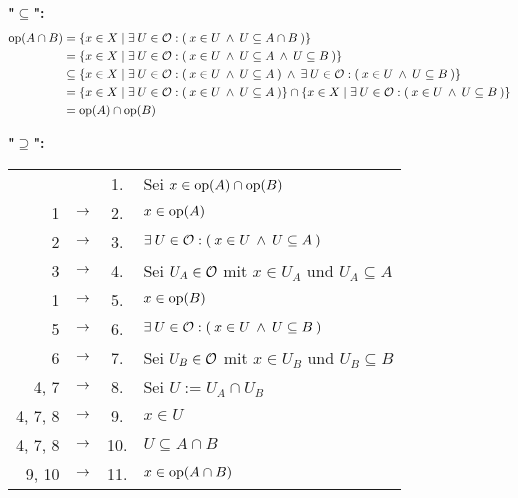     \noindent
    \textbf{"$\boldsymbol{\subseteq}$":}
        \begin{align*}
            \text{op}(A \cap B) 
            &= \{x \in X \mid \exists\: U \in \mathcal{O}: (\: x \in U \:\land\: U \subseteq A \cap B \:)\}\\
            &= \{x \in X \mid \exists\: U \in \mathcal{O}: (\: x \in U \:\land\: U \subseteq A \:\land\: U \subseteq B \:)\}\\
            &\subseteq \{x \in X \mid \exists\: U \in \mathcal{O}: (\: x \in U \:\land\: U \subseteq A\:) \:\land\: \exists\: U \in \mathcal{O}: (\: x \in U \:\land\: U \subseteq B \:)\}\\
            &= \{x \in X \mid \exists\: U \in \mathcal{O}: (\: x \in U \:\land\: U \subseteq A\:)\} \cap \{ x \in X \mid \exists\: U \in \mathcal{O}: (\: x \in U \:\land\: U \subseteq B \:)\}\\
            &= \text{op}(A) \cap \text{op}(B)
        \end{align*}

    \noindent
    \textbf{"$\boldsymbol{\supseteq}$":}
        \begin{longtable}{r c c l}
            & & 1. & Sei $x \in \text{op}(A) \cap \text{op}(B)$ \\
            1 & $\rightarrow$ & 2. & $x \in \text{op}(A)$ \\
            2 & $\rightarrow$ & 3. & $\exists\: U \in \mathcal{O}: (\: x \in U \:\land\: U \subseteq A\:)$ \\
            3 & $\rightarrow$ & 4. & Sei $U_A \in \mathcal{O}$ mit $x \in U_A$ und $U_A \subseteq A$ \\
            1 & $\rightarrow$ & 5. & $x \in \text{op}(B)$ \\
            5 & $\rightarrow$ & 6. & $\exists\: U \in \mathcal{O}: (\: x \in U \:\land\: U \subseteq B\:)$ \\
            6 & $\rightarrow$ & 7. & Sei $U_B \in \mathcal{O}$ mit $x \in U_B$ und $U_B \subseteq B$ \\
            4, 7 & $\rightarrow$ & 8. & Sei $U := U_A \cap U_B$ \\
            4, 7, 8 & $\rightarrow$ & 9. & $x \in U$ \\
            4, 7, 8 & $\rightarrow$ & 10. & $U \subseteq A \cap B$ \\
            9, 10 & $\rightarrow$ & 11. & $x \in \text{op}(A \cap B)$ \\
        \end{longtable}


